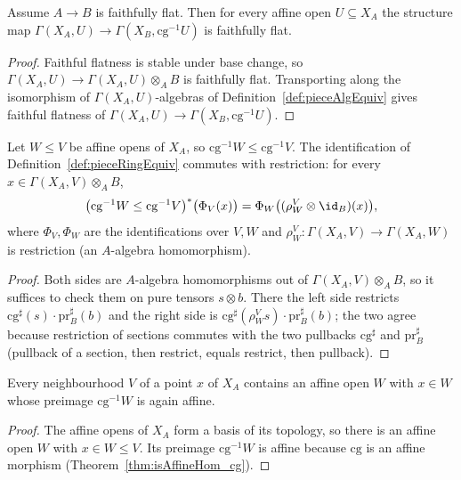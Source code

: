 \begin{theorem}
  \label{thm:faithfullyFlat_pieceCover}
  \leanok
  Assume \(A \to B\) is faithfully flat. Then for every affine open \(U \subseteq X_A\) the
  structure map \(\Gamma(X_A, U) \to \Gamma(X_B, \mathrm{cg}^{-1}U)\) is faithfully flat.
\end{theorem}
\begin{proof}
  \leanok
  Faithful flatness is stable under base change, so \(\Gamma(X_A, U) \to \Gamma(X_A, U)
  \otimes_A B\) is faithfully flat. Transporting along the isomorphism of \(\Gamma(X_A,
  U)\)-algebras of Definition~\ref{def:pieceAlgEquiv} gives faithful flatness of \(\Gamma(X_A, U)
  \to \Gamma(X_B, \mathrm{cg}^{-1}U)\).
\end{proof}

\begin{theorem}
  \label{thm:pieceRingEquiv_naturality}
  \leanok
  Let \(W \le V\) be affine opens of \(X_A\), so \(\mathrm{cg}^{-1}W \le \mathrm{cg}^{-1}V\). The
  identification of Definition~\ref{def:pieceRingEquiv} commutes with restriction: for every \(x
  \in \Gamma(X_A, V) \otimes_A B\),
  \[
    \bigl(\mathrm{cg}^{-1}W \le \mathrm{cg}^{-1}V\bigr)^{*}\bigl(\Phi_V(x)\bigr)
      = \Phi_W\bigl((\rho^{V}_{W} \otimes \id_B)(x)\bigr),
  \]
  where \(\Phi_V, \Phi_W\) are the identifications over \(V, W\) and \(\rho^{V}_{W} \colon
  \Gamma(X_A, V) \to \Gamma(X_A, W)\) is restriction (an \(A\)-algebra homomorphism).
\end{theorem}
\begin{proof}
  \leanok
  Both sides are \(A\)-algebra homomorphisms out of \(\Gamma(X_A, V) \otimes_A B\), so it
  suffices to check them on pure tensors \(s \otimes b\). There the left side restricts
  \(\mathrm{cg}^{\sharp}(s)\cdot \mathrm{pr}_B^{\sharp}(b)\) and the right side is
  \(\mathrm{cg}^{\sharp}(\rho^{V}_{W} s)\cdot \mathrm{pr}_B^{\sharp}(b)\); the two agree because
  restriction of sections commutes with the two pullbacks \(\mathrm{cg}^{\sharp}\) and
  \(\mathrm{pr}_B^{\sharp}\) (pullback of a section, then restrict, equals restrict, then
  pullback).
\end{proof}

\begin{theorem}
  \label{thm:exists_isAffineOpen_cg_le}
  \leanok
  Every neighbourhood \(V\) of a point \(x\) of \(X_A\) contains an affine open \(W\) with \(x \in
  W\) whose preimage \(\mathrm{cg}^{-1}W\) is again affine.
\end{theorem}
\begin{proof}
  \leanok
  The affine opens of \(X_A\) form a basis of its topology, so there is an affine open \(W\) with
  \(x \in W \le V\). Its preimage \(\mathrm{cg}^{-1}W\) is affine because \(\mathrm{cg}\) is an
  affine morphism (Theorem~\ref{thm:isAffineHom_cg}).
\end{proof}

